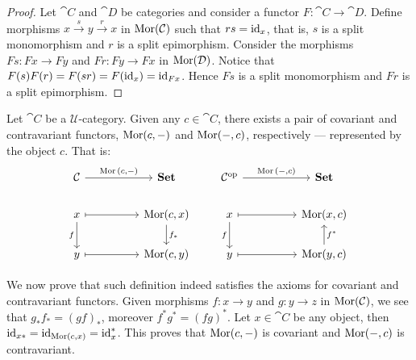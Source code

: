 \begin{proof}
Let \(\cat C\) and \(\cat D\) be categories and consider a functor \(F: \cat C
\to \cat D\). Define morphisms \(x \xrightarrow s y \xrightarrow r x\) in
\(\operatorname{Mor}(\mathcal C)\) such that \(r s = \operatorname{id}_x\), that is, \(s\) is a split
monomorphism and \(r\) is a split epimorphism. Consider the morphisms \(F s: F
x \to F y\) and \(F r: F y \to F x\) in \(\operatorname{Mor}(\mathcal D)\). Notice that \(F (s)
F(r) = F(s r) = F(\operatorname{id}_x) = \operatorname{id}_{F x}\). Hence \(F s\) is a split monomorphism
and \(F r\) is a split epimorphism.
\end{proof}

\begin{definition}\label{def:hom-functors}
Let \(\cat C\) be a \(\mathcal U\)-category. Given any \(c \in \cat C\), there
exists a pair of covariant and contravariant functors, \(\operatorname{Mor}(c, -)\) and
\(\operatorname{Mor}(-, c)\), respectively --- represented by the object \(c\). That is:
\[
  \begin{tikzcd}
    \cat C \ar[rr, "\Hom{(c, -)}"] & & \Set
    \\
    x \ar[rr, maps to] \ar[d, swap, "f"]
    & & \Hom(c, x) \ar[d, "f_*"]
    \\
    y \ar[rr, maps to] & & \Hom(c, y)
  \end{tikzcd}
  \qquad
  \begin{tikzcd}
    \cat C^\op \ar[rr, "\Hom{(-, c)}"] & & \Set
    \\
    x \ar[rr, maps to] \ar[d, swap, "f"]
    & & \Hom(x, c)
    \\
    y \ar[rr, maps to] & & \cat \Hom(y, c) \ar[u, swap, "f^*"]
  \end{tikzcd}
\]
\end{definition}

We now prove that such definition indeed satisfies the axioms for covariant and
contravariant functors. Given morphisms \(f: x \to y\) and \(g: y \to z\) in
\(\operatorname{Mor}(\mathcal C)\), we see that \(g_* f_* = (g f)_*\), moreover \(f^* g^* = (f
g)^*\). Let \(x \in \cat C\) be any object, then \(\operatorname{id}_{x *} = \operatorname{id}_{\operatorname{Mor}(c, x)}
= \operatorname{id}_x^*\). This proves that \(\operatorname{Mor}(c, -)\) is covariant and \(\operatorname{Mor}(-, c)\) is
contravariant.

